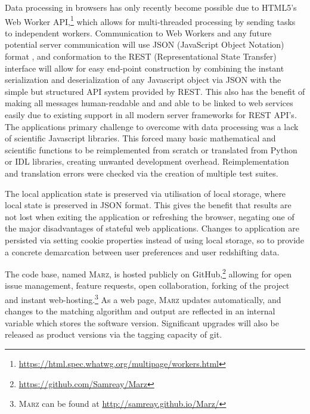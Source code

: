 \documentclass[5p]{elsarticle}
\newcommand{\marz}{\textsc{Marz}}
\begin{document}
Data processing in browsers has only recently become possible due to HTML5's Web Worker API,\footnote{\url{https://html.spec.whatwg.org/multipage/workers.html}} which allows for multi-threaded processing by sending tasks to independent workers. Communication to Web Workers and any future potential server communication will use JSON (JavaScript Object Notation) format \citep{bray2014javascript2}, and conformation to the REST (Representational State Transfer) interface \citep{windley11rest} will allow for easy end-point construction by combining the instant serialization and deserialization of any Javascript object via JSON with the simple but structured API system provided by REST. This also has the benefit of making all messages human-readable and and able to be linked to web services easily due to existing support in all modern server frameworks for REST API's. The applications primary challenge to overcome with data processing was a lack of scientific Javascript libraries. This forced many basic mathematical and scientific functions to be reimplemented from scratch or translated from Python or IDL libraries, creating unwanted development overhead. Reimplementation and translation errors were checked via the creation of multiple test suites.


The local application state is preserved via utilisation of local storage, where local state is preserved in JSON format. This gives the benefit that results are not lost when exiting the application or refreshing the browser, negating one of the major disadvantages of stateful web applications. Changes to application are persisted via setting cookie properties instead of using local storage, so to provide a concrete demarcation between user preferences and user redshifting data.



The code base, named \marz{}, is hosted publicly on GitHub,\footnote{\url{https://github.com/Samreay/Marz}} allowing for open issue management, feature requests, open collaboration, forking of the project and instant web-hosting.\footnote{\marz{} can be found at \url{http://samreay.github.io/Marz/}} As a web page, \marz{} updates automatically, and changes to the matching algorithm and output are reflected in an internal variable which stores the software version. Significant upgrades will also be released as product versions via the tagging capacity of git.
\end{document}
